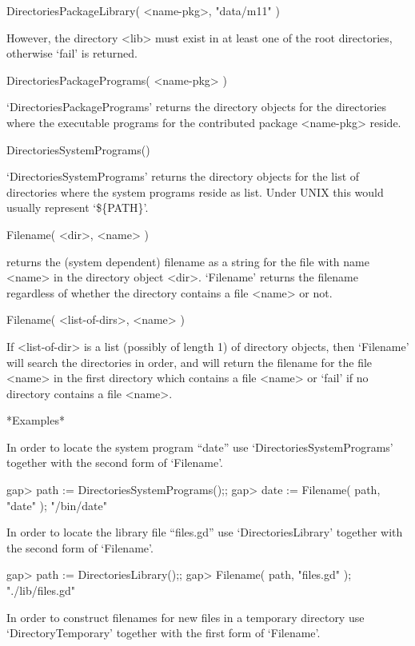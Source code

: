 \begintt
    DirectoriesPackageLibrary( <name-pkg>, "data/m11" )
\endtt

However,   the directory <lib>  must  exist in at   least one of the root
directories, otherwise `fail' is returned.

\>DirectoriesPackagePrograms( <name-pkg> )

`DirectoriesPackagePrograms'   returns  the directory   objects   for the
directories where the  executable programs  for the contributed   package
<name-pkg> reside.

\>DirectoriesSystemPrograms()

`DirectoriesSystemPrograms' returns the directory objects for the list of
directories where  the system programs reside as  list.  Under  UNIX this
would usually represent `\$\{PATH\}'.


\>Filename( <dir>, <name> )

returns the (system  dependent)  filename as  a string for  the file with
name   <name> in the  directory  object  <dir>.   `Filename' returns  the
filename regardless of  whether the directory contains  a file <name>  or
not.

\>Filename( <list-of-dirs>, <name> )

If <list-of-dir>  is a list (possibly of  length 1) of directory objects,
then `Filename' will search the directories in order, and will return the
filename for the file <name> in the first directory which contains a file
<name> or `fail' if no directory contains a file <name>.

*Examples*

In    order  to      locate   the    system   program    ``date''     use
`DirectoriesSystemPrograms' together with the second form of `Filename'.

\begintt
    gap> path := DirectoriesSystemPrograms();;
    gap> date := Filename( path, "date" );
    "/bin/date"
\endtt

In order to locate the library file ``files.gd'' use `DirectoriesLibrary'
together with the second form of `Filename'.

\begintt
    gap> path := DirectoriesLibrary();;
    gap> Filename( path, "files.gd" );
    "./lib/files.gd"
\endtt

In  order to construct filenames for  new  files in a temporary directory
use `DirectoryTemporary' together with the first form of `Filename'.

